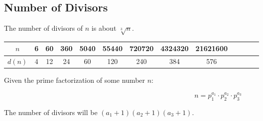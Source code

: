 \subsection{Number of Divisors}

The number of divisors of $n$ is about $\sqrt[3]{n}$.

\begin{table}[H]
    \centering
    \begin{tabular}{|c|c|c|c|c|c|c|c|c|c|c|c|c|}
        \hline
        \cellcolor{gray!40} $n$ & 6 & 60 & 360 & 5040 & 55440 & 720720 & 4324320 & 21621600 \\
        \hline
        \cellcolor{gray!40} $d(n)$ & 4 & 12 & 24 & 60 & 120 & 240 & 384 & 576 \\
        \hline
    \end{tabular}
\end{table}

Given the prime factorization of some number $n$:

$$n = p_{1}^{a_1} \cdot p_{2}^{a_2} \cdot p_{3}^{a_3}$$

The number of divisors will be $(a_1 + 1)(a_2 + 1)(a_3 + 1)$.
